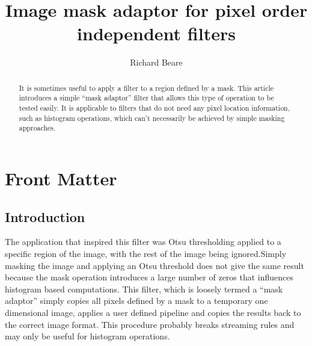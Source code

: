 \documentclass{InsightArticle}
\title{Image mask adaptor for pixel order independent filters}
\author{Richard Beare}
\begin{document}
\maketitle

\ifhtml
\chapter*{Front Matter\label{front}}
\fi


\begin{abstract}
\noindent
It is sometimes useful to apply a filter to a region defined by a
mask. This article introduces a simple ``mask adaptor'' filter that
allows this type of operation to be tested easily. It is applicable to
filters that do not need any pixel location information, such as
histogram operations, which can't necessarily be achieved by simple
masking approaches.
\end{abstract}

\tableofcontents

\section{Introduction}
 The application that inspired this filter was Otsu thresholding
 applied to a specific region of the image, with the rest of the image
 being ignored.Simply masking the image and applying an Otsu threshold
 does not give the same result because the mask operation introduces a
 large number of zeros that influences histogram based
 computations. This filter, which is loosely termed a ``mask adaptor''
 simply copies all pixels defined by a mask to a temporary one
 dimensional image, applies a user defined pipeline and copies the
 results back to the correct image format. This procedure probably
 breaks streaming rules and may only be useful for histogram
 operations.
\end{document}

